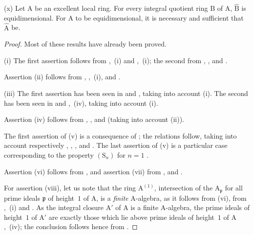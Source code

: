 \begin{scholium}[7.8.3]

\textup{(x)} Let $\mathrm{A}$ be an excellent local ring. For every integral quotient ring $\mathrm{B}$ of $\mathrm{A}$, $\widehat{\mathrm{B}}$ is equidimensional. For $\mathrm{A}$ to be equidimensional, it is necessary and sufficient that $\widehat{\mathrm{A}}$ be.
\end{scholium}

\begin{proof}
Most of these results have already been proved.

(i) The first assertion follows from ,~(i) and ,~(i); the second from , ,  and .

Assertion (ii) follows from , ,~(i),  and .

(iii) The first assertion has been seen in  and , taking into account (i). The second has been seen in  and ,~(iv), taking into account (i).

Assertion (iv) follows from , ,  and  (taking into account (ii)).

The first assertion of (v) is a consequence of ; the relations  follow, taking into account respectively , , ,  and . The last assertion of (v) is a particular case corresponding to the property $(\mathrm{S}_n)$ for $n=1$ .

Assertion (vi) follows from , and assertion (vii) from ,  and .

For assertion (viii), let us note that the ring $\mathrm{A}^{(1)}$, intersection of the $\mathrm{A}_\mathfrak{p}$ for all prime ideals $\mathfrak{p}$ of height~$1$ of $\mathrm{A}$, is a \emph{finite} $\mathrm{A}$-algebra, as it follows from (vi), from ,~(i) and . As the integral closure $\mathrm{A}'$ of $\mathrm{A}$ is a finite $\mathrm{A}$-algebra, the prime ideals of height~$1$ of $\mathrm{A}'$ are exactly those which lie above prime ideals of height~$1$ of $\mathrm{A}$ ,~(iv); the conclusion follows hence from .


\end{proof}
